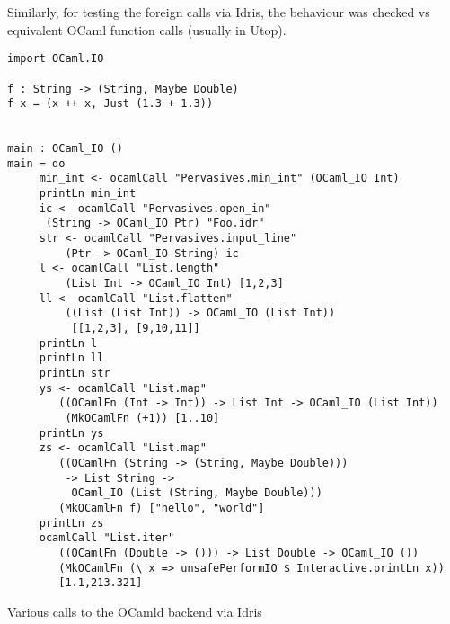 Similarly, for testing the foreign calls via Idris, the behaviour was checked
vs equivalent OCaml function calls (usually in Utop).
\begin{listing}[H]
    \begin{verbatim}
import OCaml.IO

f : String -> (String, Maybe Double)
f x = (x ++ x, Just (1.3 + 1.3))


main : OCaml_IO ()
main = do 
     min_int <- ocamlCall "Pervasives.min_int" (OCaml_IO Int)
     printLn min_int
     ic <- ocamlCall "Pervasives.open_in"
      (String -> OCaml_IO Ptr) "Foo.idr"
     str <- ocamlCall "Pervasives.input_line"
         (Ptr -> OCaml_IO String) ic
     l <- ocamlCall "List.length"
         (List Int -> OCaml_IO Int) [1,2,3]
     ll <- ocamlCall "List.flatten" 
         ((List (List Int)) -> OCaml_IO (List Int))
          [[1,2,3], [9,10,11]]
     printLn l
     printLn ll
     printLn str
     ys <- ocamlCall "List.map" 
        ((OCamlFn (Int -> Int)) -> List Int -> OCaml_IO (List Int)) 
         (MkOCamlFn (+1)) [1..10]
     printLn ys
     zs <- ocamlCall "List.map"
        ((OCamlFn (String -> (String, Maybe Double)))
         -> List String ->
          OCaml_IO (List (String, Maybe Double)))
        (MkOCamlFn f) ["hello", "world"]
     printLn zs
     ocamlCall "List.iter" 
        ((OCamlFn (Double -> ())) -> List Double -> OCaml_IO ()) 
        (MkOCamlFn (\ x => unsafePerformIO $ Interactive.printLn x)) 
        [1.1,213.321]
    \end{verbatim}
    \caption{Various calls to the OCamld backend via Idris}
\end{listing}



